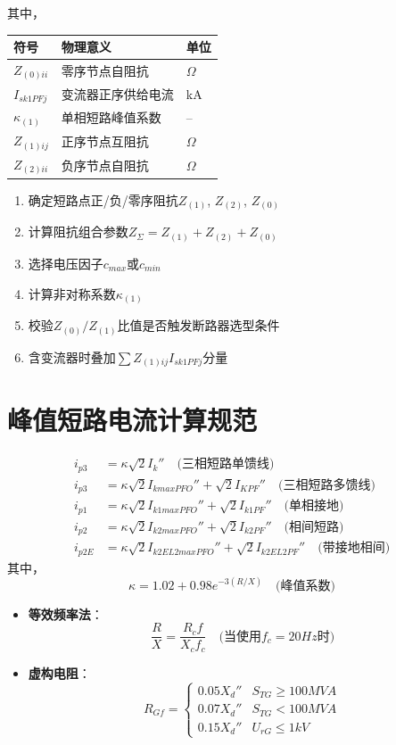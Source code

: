 \documentclass[a4paper,11pt,AutoFakeBold]{ctexart}
\begin{document}
其中，

\begin{tabular}{lll}
符号 & 物理意义 & 单位 \\
\hline
$Z_{(0)ii}$ & 零序节点自阻抗 & $\Omega$ \\
$I_{sk1PFj}$ & 变流器正序供给电流 & \si{kA} \\
$\kappa_{(1)}$ & 单相短路峰值系数 & -- \\
$Z_{(1)ij}$ & 正序节点互阻抗 & $\Omega$ \\
$Z_{(2)ii}$ & 负序节点自阻抗 & $\Omega$ \\
\end{tabular}


\begin{enumerate}
\item 确定短路点正/负/零序阻抗$Z_{(1)}$, $Z_{(2)}$, $Z_{(0)}$
\item 计算阻抗组合参数$Z_\Sigma = Z_{(1)} + Z_{(2)} + Z_{(0)}$
\item 选择电压因子$c_{max}$或$c_{min}$
\item 计算非对称系数$\kappa_{(1)}$
\item 校验$Z_{(0)}/Z_{(1)}$比值是否触发断路器选型条件
\item 含变流器时叠加$\sum Z_{(1)ij}I_{sk1PFj}$分量
\end{enumerate}

\newpage
\section{峰值短路电流计算规范}

\begin{align}
i_{p3} &= \kappa \sqrt{2} I_{k}'' \quad \text{(三相短路单馈线)} \label{eq:peak3} \\
i_{p3} &= \kappa \sqrt{2} I_{kmaxPFO}'' + \sqrt{2}I_{KPF}''\quad\text{(三相短路多馈线)} \\
i_{p1} &= \kappa \sqrt{2} I_{k1maxPFO}'' + \sqrt{2}I_{k1PF}'' \quad \text{(单相接地)} \label{eq:peak1} \\
i_{p2} &= \kappa \sqrt{2} I_{k2maxPFO}'' + \sqrt{2}I_{k2PF}'' \quad \text{(相间短路)} \label{eq:peak2} \\
i_{p2E} &= \kappa \sqrt{2} I_{k2EL2maxPFO}'' + \sqrt{2}I_{k2EL2PF}'' \quad \text{(带接地相间)} \label{eq:peak2e}
\end{align}
其中，
\[ \kappa = 1.02 + 0.98e^{-3(R/X)} \quad \text{(峰值系数)} \]


\begin{itemize}
  
\item \textbf{等效频率法}：
  \[ \frac{R}{X} = \frac{R_c f}{X_c f_c} \quad \text{(当使用} f_c=20\si{Hz} \text{时)} \]

\item \textbf{虚构电阻}：
  \[
  R_{Gf} = 
  \begin{cases}
  0.05X_d'' & S_{TG} \geq 100\si{MVA} \\
  0.07X_d'' & S_{TG} < 100\si{MVA} \\
  0.15X_d'' & U_{rG} \leq 1\si{kV}
  \end{cases}
  \]
\end{itemize}
\end{document}
